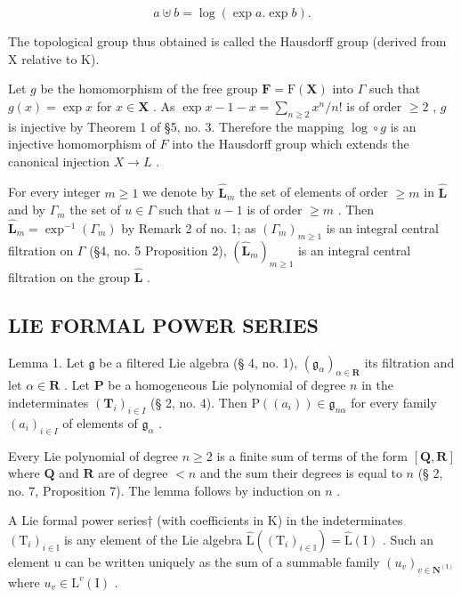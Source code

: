 \[
a \uplus b = \log (\exp a. \exp b).
\]

The topological group thus obtained is called the Hausdorff group (derived from X relative to K).

Let \(g\) be the homomorphism of the free group \(\mathbf{F} = \mathrm{F}(\mathbf{X})\) into \(\Gamma\) such that \(g(x) = \exp x\) for \(x \in \mathbf{X}\) . As \(\exp x - 1 - x = \sum_{n \geqslant 2} x^n / n!\) is of order \(\geqslant 2\) , \(g\) is injective by Theorem 1 of §5, no. 3. Therefore the mapping \(\log \circ g\) is an injective homomorphism of \(F\) into the Hausdorff group which extends the canonical injection \(X \to L\) .

For every integer \(m \geqslant 1\) we denote by \(\hat{\mathbf{L}}_m\) the set of elements of order \(\geqslant m\) in \(\hat{\mathbf{L}}\) and by \(\Gamma_m\) the set of \(u \in \Gamma\) such that \(u - 1\) is of order \(\geqslant m\) . Then \(\hat{\mathbf{L}}_m = \exp^{-1}(\Gamma_m)\) by Remark 2 of no. 1; as \((\Gamma_m)_{m \geqslant 1}\) is an integral central filtration on \(\Gamma\) (§4, no. 5 Proposition 2), \((\hat{\mathbf{L}}_m)_{m \geqslant 1}\) is an integral central filtration on the group \(\hat{\mathbf{L}}\) .

\subsection{LIE FORMAL POWER SERIES}

Lemma 1. Let \(\mathfrak{g}\) be a filtered Lie algebra (§ 4, no. 1), \((\mathfrak{g}_{\alpha})_{\alpha \in \mathbf{R}}\) its filtration and let \(\alpha \in \mathbf{R}\) . Let \(\mathbf{P}\) be a homogeneous Lie polynomial of degree \(n\) in the indeterminates \((\mathbf{T}_i)_{i \in I}\) (§ 2, no. 4). Then \(\mathrm{P}((a_i)) \in \mathfrak{g}_{n\alpha}\) for every family \((a_i)_{i \in I}\) of elements of \(\mathfrak{g}_{\alpha}\) .

Every Lie polynomial of degree \(n \geqslant 2\) is a finite sum of terms of the form \([\mathbf{Q}, \mathbf{R}]\) where \(\mathbf{Q}\) and \(\mathbf{R}\) are of degree \(< n\) and the sum their degrees is equal to \(n\) (§ 2, no. 7, Proposition 7). The lemma follows by induction on \(n\) .

A Lie formal power series† (with coefficients in K) in the indeterminates \((\mathrm{T}_{i})_{i\in\mathbb{I}}\) is any element of the Lie algebra \(\hat{\mathrm{L}}((\mathrm{T}_{i})_{i\in\mathbb{I}})=\hat{\mathrm{L}}(\mathrm{I})\) . Such an element u can be written uniquely as the sum of a summable family \((u_{v})_{v\in\mathbf{N}^{(\mathrm{I})}}\) where \(u_{v}\in\mathrm{L}^{v}(\mathrm{I})\) .

